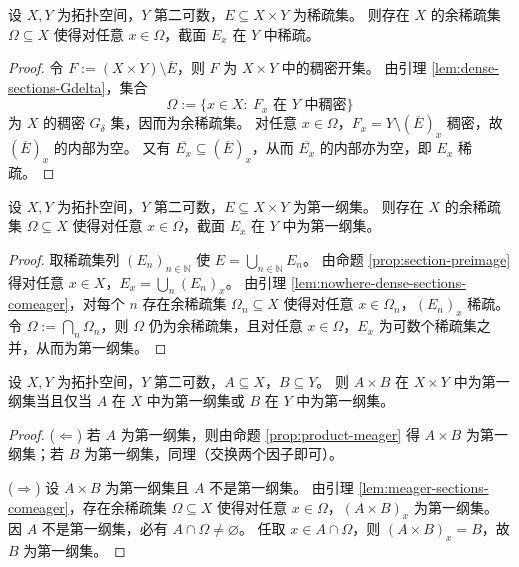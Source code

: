 \documentclass[lang=cn,a4paper,newtx,figureplace=section,tableplace=section]{elegantbook}
\begin{document}
\begin{lemma}\label{lem:nowhere-dense-sections-comeager}
  设 $X,Y$ 为拓扑空间，$Y$ 第二可数，$E\subseteq X\times Y$ 为稀疏集。
  则存在 $X$ 的余稀疏集 $\Omega\subseteq X$ 使得对任意 $x\in\Omega$，截面 $E_x$ 在 $Y$ 中稀疏。
\end{lemma}
\begin{proof}
  令 $F:=(X\times Y)\setminus\overline E$，则 $F$ 为 $X\times Y$ 中的稠密开集。
  由引理 \ref{lem:dense-sections-Gdelta}，集合
  \[
    \Omega:=\{x\in X:\ F_x\text{ 在 }Y\text{ 中稠密}\}
  \]
  为 $X$ 的稠密 $G_\delta$ 集，因而为余稀疏集。
  对任意 $x\in\Omega$，$F_x=Y\setminus(\overline E)_x$ 稠密，故 $(\overline E)_x$ 的内部为空。
  又有 $\overline{E_x}\subseteq (\overline E)_x$，从而 $\overline{E_x}$ 的内部亦为空，即 $E_x$ 稀疏。
\end{proof}

\begin{lemma}\label{lem:meager-sections-comeager}
  设 $X,Y$ 为拓扑空间，$Y$ 第二可数，$E\subseteq X\times Y$ 为第一纲集。
  则存在 $X$ 的余稀疏集 $\Omega\subseteq X$ 使得对任意 $x\in\Omega$，截面 $E_x$ 在 $Y$ 中为第一纲集。
\end{lemma}
\begin{proof}
  取稀疏集列 $(E_n)_{n\in\mathbb N}$ 使 $E=\bigcup_{n\in\mathbb N}E_n$。
  由命题 \ref{prop:section-preimage} 得对任意 $x\in X$，$E_x=\bigcup_n (E_n)_x$。
  由引理 \ref{lem:nowhere-dense-sections-comeager}，对每个 $n$ 存在余稀疏集 $\Omega_n\subseteq X$ 使得对任意 $x\in\Omega_n$，$(E_n)_x$ 稀疏。
  令 $\Omega:=\bigcap_n\Omega_n$，则 $\Omega$ 仍为余稀疏集，且对任意 $x\in\Omega$，$E_x$ 为可数个稀疏集之并，从而为第一纲集。
\end{proof}

\begin{theorem}\label{thm:rectangle-meager-iff}
  设 $X,Y$ 为拓扑空间，$Y$ 第二可数，$A\subseteq X$，$B\subseteq Y$。
  则 $A\times B$ 在 $X\times Y$ 中为第一纲集当且仅当 $A$ 在 $X$ 中为第一纲集或 $B$ 在 $Y$ 中为第一纲集。
\end{theorem}
\begin{proof}
  ($\Leftarrow$) 若 $A$ 为第一纲集，则由命题 \ref{prop:product-meager} 得 $A\times B$ 为第一纲集；若 $B$ 为第一纲集，同理（交换两个因子即可）。

  ($\Rightarrow$) 设 $A\times B$ 为第一纲集且 $A$ 不是第一纲集。
  由引理 \ref{lem:meager-sections-comeager}，存在余稀疏集 $\Omega\subseteq X$ 使得对任意 $x\in\Omega$，$(A\times B)_x$ 为第一纲集。
  因 $A$ 不是第一纲集，必有 $A\cap\Omega\neq\varnothing$。
  任取 $x\in A\cap\Omega$，则 $(A\times B)_x=B$，故 $B$ 为第一纲集。
\end{proof}
\end{document}
